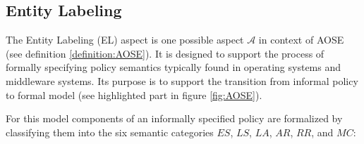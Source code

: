 \documentclass[twoside, openright, 12pt]{book}
\begin{document}
\subsection{Entity Labeling}
\label{EL}
The Entity Labeling (EL) aspect is one possible aspect $\mathcal{A}$ in context of AOSE (see definition \ref{definition:AOSE}).
It is designed to support the process of formally specifying policy semantics typically found in operating systems and middleware systems.
Its purpose is to support the transition from informal policy to formal model (see highlighted part in figure \ref{fig:AOSE}).

For this model components of an informally specified policy are formalized by classifying them into the six semantic categories $\mathit{ES}$, $\mathit{LS}$, $\mathit{LA}$, $\mathit{AR}$, $\mathit{RR}$, and $\mathit{MC}$:
\end{document}
